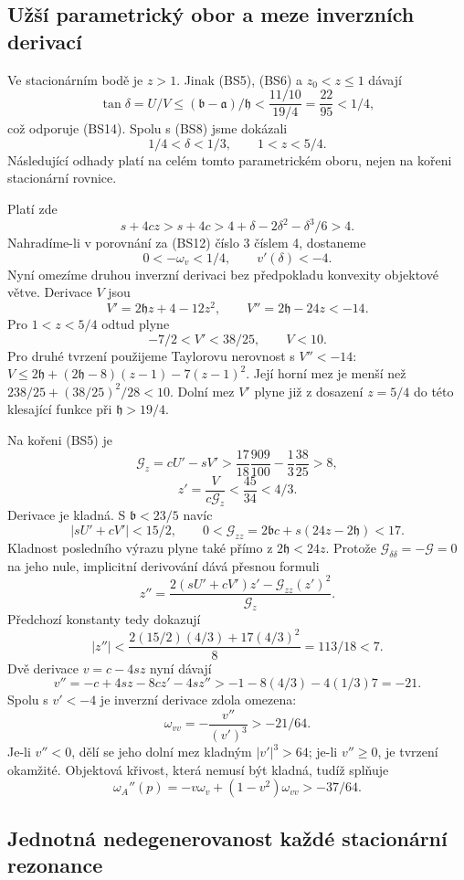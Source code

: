\documentclass[11pt,a4paper]{article}
\theoremstyle{remark}\newtheorem{remark}[theorem]{Poznámka}
\numberwithin{equation}{section}
\begin{document}
\subsection{Užší parametrický obor a meze inverzních derivací}

Ve stacionárním bodě je \(z>1\). Jinak (BS5), (BS6) a
\(z_0<z\le1\) dávají
\[
\tan\delta=U/V
\le(\mathfrak b-\mathfrak a)/\mathfrak h
<\frac{11/10}{19/4}=\frac{22}{95}<1/4,
\]
což odporuje (BS14). Spolu s (BS8) jsme dokázali
\[
\boxed{1/4<\delta<1/3,\qquad 1<z<5/4.}
\tag{BS15}
\]
Následující odhady platí na celém tomto parametrickém oboru,
nejen na kořeni stacionární rovnice.

Platí zde
\[
s+4cz>s+4c>4+\delta-2\delta^2-\delta^3/6>4.
\]
Nahradíme-li v porovnání za (BS12) číslo 3 číslem 4, dostaneme
\[
\boxed{0<-\omega_v<1/4,\qquad v'(\delta)<-4.}
\tag{BS16}
\]
Nyní omezíme druhou inverzní derivaci bez předpokladu konvexity
objektové větve. Derivace \(V\) jsou
\[
V'=2\mathfrak h z+4-12z^2,
\qquad V''=2\mathfrak h-24z<-14.
\]
Pro \(1<z<5/4\) odtud plyne
\[
-7/2<V'<38/25,\qquad V<10.
\tag{BS17}
\]
Pro druhé tvrzení použijeme Taylorovu nerovnost s \(V''<-14\):
\(V\le2\mathfrak h+(2\mathfrak h-8)(z-1)-7(z-1)^2\).
Její horní mez je menší než
\(238/25+(38/25)^2/28<10\). Dolní mez \(V'\) plyne již
z dosazení \(z=5/4\) do této klesající funkce při
\(\mathfrak h>19/4\).

Na kořeni (BS5) je
\[
\mathscr G_z=cU'-sV'
>\frac{17}{18}\frac{909}{100}-\frac13\frac{38}{25}>8,
\]
\[
z'=\frac{V}{c\mathscr G_z}<\frac{45}{34}<4/3.
\tag{BS18}
\]
Derivace je kladná. S \(\mathfrak b<23/5\) navíc
\[
|sU'+cV'|<15/2,
\qquad
0<\mathscr G_{zz}=2\mathfrak b c+s(24z-2\mathfrak h)<17.
\]
Kladnost posledního výrazu plyne také přímo z \(2\mathfrak h<24z\).
Protože \(\mathscr G_{\delta\delta}=-\mathscr G=0\) na jeho nule,
implicitní derivování dává přesnou formuli
\[
z''=\frac{2(sU'+cV')z'-\mathscr G_{zz}(z')^2}{\mathscr G_z}.
\]
Předchozí konstanty tedy dokazují
\[
\boxed{|z''|<\frac{2(15/2)(4/3)+17(4/3)^2}{8}
=113/18<7.}
\tag{BS19}
\]
Dvě derivace \(v=c-4sz\) nyní dávají
\[
v''=-c+4sz-8cz'-4sz''>-1-8(4/3)-4(1/3)7=-21.
\]
Spolu s \(v'<-4\) je inverzní derivace zdola omezena:
\[
\omega_{vv}=-\frac{v''}{(v')^3}>-21/64.
\]
Je-li \(v''<0\), dělí se jeho dolní mez kladným
\(|v'|^3>64\); je-li \(v''\ge0\), je tvrzení okamžité.
Objektová křivost, která nemusí být kladná, tudíž splňuje
\[
\boxed{\omega_A''(p)
=-v\omega_v+(1-v^2)\omega_{vv}>-37/64.}
\tag{BS20}
\]

\subsection{Jednotná nedegenerovanost každé stacionární rezonance}
\end{document}

